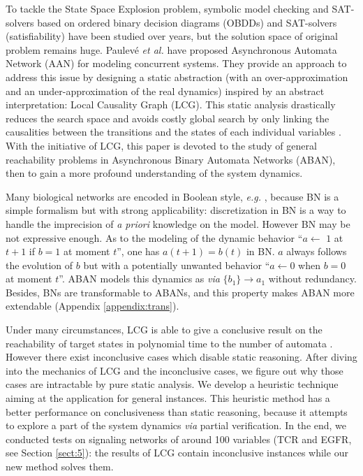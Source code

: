 \documentclass[runningheads]{llncs}
\newcommand{\ac}[3]{$\{#1\}\rightarrow#3$}
\begin{document}
To tackle the State Space Explosion problem, symbolic model checking \cite{burch1992symbolic} and SAT-solvers based on ordered binary decision diagrams (OBDDs) and SAT-solvers (satisfiability) \cite{abdulla2000symbolic} have been studied over years, but the solution space of original problem remains huge.
Paulev\'e \textit{et al.} \cite{folschette2015,pauleve2011} have proposed Asynchronous Automata Network (AAN) for modeling concurrent systems.
They provide an approach to address this issue by designing a static abstraction (with an over-approximation and an under-approximation of the real dynamics) inspired by an abstract interpretation: Local Causality Graph (LCG).
This static analysis drastically reduces the search space and avoids costly global search by only linking the causalities between the transitions and the states of each individual variables  \cite{pauleve2012}.
With the initiative of LCG, this paper is devoted to the study of general reachability problems in Asynchronous Binary Automata Networks (ABAN), then to gain a more profound understanding of the system dynamics. 

Many biological networks are encoded in Boolean style, \textit{e.g.} \cite{akutsu2007control,kauffman1969}, because BN is a simple formalism but with strong applicability: discretization in BN is a way to handle the imprecision of \textit{a priori} knowledge on the model.
However BN may be not expressive enough.
As to the modeling of the dynamic behavior ``$a\gets$ $1$ at $t+1$ if $b=1$ at moment $t$'', one has $a(t+1)=b(t)$ in BN.
$a$ always follows the evolution of $b$ but with a potentially unwanted behavior ``$a\gets 0$ when $b=0$ at moment $t$''.
ABAN models this dynamics as \textit{via} \ac{b_1}{a_0}{a_1} without redundancy. 
Besides, BNs are transformable to ABANs, and this property makes ABAN more extendable (Appendix \ref{appendix:trans}).

Under many circumstances, LCG is able to give a conclusive result on the reachability of target states in polynomial time to the number of automata \cite{pauleve2016goal}. 
However there exist inconclusive cases which disable static reasoning.
After diving into the mechanics of LCG and the inconclusive cases, we figure out why those cases are intractable by pure static analysis. 
We develop a heuristic technique aiming at the application for general instances. 
This heuristic method has a better performance on conclusiveness than static reasoning, because it attempts to explore a part of the system dynamics \textit{via} partial verification.
In the end, we conducted tests on signaling networks of around 100 variables (TCR and EGFR, see Section \ref{sect:5}): the results of LCG contain inconclusive instances \cite{folschette2015} while our new method solves them.
\end{document}
